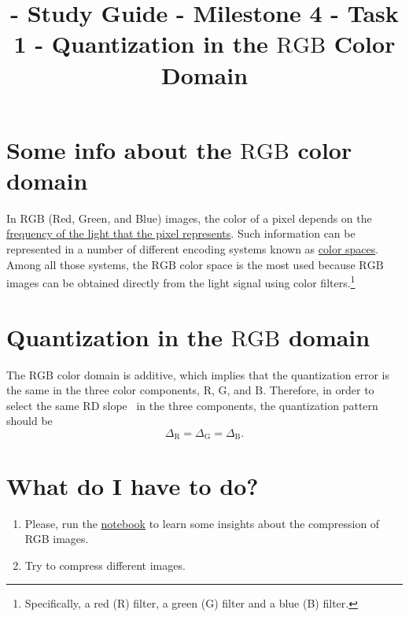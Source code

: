 

\title{\SM{} - Study Guide - Milestone 4 - Task 1 - Quantization in the $\text{RGB}$ Color Domain}

\maketitle

\tableofcontents

\section{Some info about the $\text{RGB}$ color domain}

In $\text{RGB}$ (Red, Green, and Blue) images, the color of a pixel
depends on the
\href{https://en.wikipedia.org/wiki/Visible_spectrum}{frequency of the
  light that the pixel represents}. Such information can be
represented in a number of different encoding systems known as
\href{https://en.wikipedia.org/wiki/Color_space}{color spaces}. Among
all those systems, the $\text{RGB}$ color space is the most used
because $\text{RGB}$ images can be obtained directly from the light
signal using color filters.\footnote{Specifically, a red (R) filter, a
green (G) filter and a blue (B) filter.}


\section{Quantization in the $\text{RGB}$ domain}

The $\text{RGB}$ color domain is additive, which implies that the
quantization error is the same in the three color components,
$\text{R}$, $\text{G}$, and $\text{B}$. Therefore, in order to select
the same RD slope~\cite{vruiz__information_theory} in the three
components, the quantization pattern should be
\begin{equation}
  \Delta_\text{R} = \Delta_\text{G} = \Delta_\text{B}.
\end{equation}


\section{What do I have to do?}

\begin{enumerate}
\item Please, run the
  \href{https://github.com/Sistemas-Multimedia/Sistemas-Multimedia.github.io/blob/master/contents/RGB_quantization/RD_performance.ipynb}{notebook}
  to learn some insights about the compression of RGB images.
\item Try to compress different images.
\end{enumerate}

